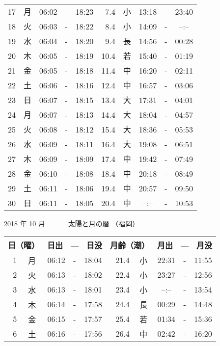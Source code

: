 \documentclass[a4j,10pt]{jsarticle}
\begin{document}
\begin{center}
\begin{table}[ht]
\begin{center}
\begin{tabular}{|rc|ccc|rc|ccc|}
 17 & 月 & 06:02 &-& 18:23 &  7.4 & 小 & 13:18 &-& 23:40 \\
 18 & 火 & 06:03 &-& 18:22 &  8.4 & 小 & 14:09 &-&  --:--  \\
 19 & 水 & 06:04 &-& 18:20 &  9.4 & 長 & 14:56 &-& 00:28 \\
 20 & 木 & 06:05 &-& 18:19 & 10.4 & 若 & 15:40 &-& 01:19 \\
 21 & 金 & 06:05 &-& 18:18 & 11.4 & 中 & 16:20 &-& 02:11 \\
 22 & 土 & 06:06 &-& 18:16 & 12.4 & 中 & 16:57 &-& 03:06 \\
 23 & 日 & 06:07 &-& 18:15 & 13.4 & 大 & 17:31 &-& 04:01 \\
 24 & 月 & 06:07 &-& 18:13 & 14.4 & 大 & 18:04 &-& 04:57 \\
 25 & 火 & 06:08 &-& 18:12 & 15.4 & 大 & 18:36 &-& 05:53 \\
 26 & 水 & 06:09 &-& 18:11 & 16.4 & 大 & 19:08 &-& 06:51 \\
 27 & 木 & 06:09 &-& 18:09 & 17.4 & 中 & 19:42 &-& 07:49 \\
 28 & 金 & 06:10 &-& 18:08 & 18.4 & 中 & 20:18 &-& 08:49 \\
 29 & 土 & 06:11 &-& 18:06 & 19.4 & 中 & 20:57 &-& 09:50 \\
 30 & 日 & 06:11 &-& 18:05 & 20.4 & 中 &  --:--  &-& 10:53 \\
    \hline
    \end{tabular}
    \end{center}
\end{table}
\newpage
  {\large 2018 年 10 月}
  {\Large 　　　太陽と月の暦   （福岡） }
  \begin{table}[ht]
  \begin{center}
     \begin{tabular}{|rc|ccc|rc|ccc|}
     \hline
     \multicolumn{2}{|c|}{日（曜）} & \multicolumn{3}{c|}{日出　―　日没} & \multicolumn{2}{c|}{月齢（潮）} & \multicolumn{3}{c|}{月出　―　月没}\\
     \hline
  1 & 月 & 06:12 &-& 18:04 & 21.4 & 小 & 22:31 &-& 11:55 \\
  2 & 火 & 06:13 &-& 18:02 & 22.4 & 小 & 23:27 &-& 12:56 \\
  3 & 水 & 06:13 &-& 18:01 & 23.4 & 小 &  --:--  &-& 13:54 \\
  4 & 木 & 06:14 &-& 17:58 & 24.4 & 長 & 00:29 &-& 14:48 \\
  5 & 金 & 06:15 &-& 17:57 & 25.4 & 若 & 01:34 &-& 15:36 \\
  6 & 土 & 06:16 &-& 17:56 & 26.4 & 中 & 02:42 &-& 16:20 \\

\end{tabular}
\end{center}
\end{table}
\end{center}
\end{document}
